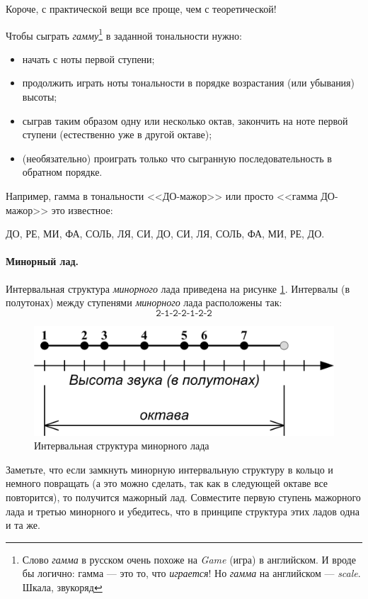 Короче, с практической вещи все проще, чем с теоретической!

Чтобы сыграть \emph{гамму}\footnote{Слово \emph{гамма} в русском очень похоже на \emph{Game} (игра) в английском. И вроде бы логично: гамма --- это то, что \emph{играется}! Но \emph{гамма} на английском --- \emph{scale}. Шкала, звукоряд} в заданной тональности нужно:
\begin{itemize}
    \item начать с ноты первой ступени;
    \item продолжить играть ноты тональности в порядке возрастания (или убывания) высоты;
    \item сыграв таким образом одну или несколько октав, закончить на ноте первой ступени (естественно уже в другой октаве); 
    \item (необязательно) проиграть только что сыгранную последовательность в обратном порядке.
\end{itemize}

Например, гамма в тональности <<ДО-мажор>> или просто <<гамма ДО-мажор>> это известное: 
\begin{center}
    ДО, РЕ, МИ, ФА, СОЛЬ, ЛЯ, СИ, ДО, СИ, ЛЯ, СОЛЬ, ФА, МИ, РЕ, ДО.
\end{center}


\paragraph{Минорный лад.} Интервальная структура \emph{минорного} лада приведена на рисунке \ref{fig:harmony:lad:mode:min}. Интервалы (в полутонах) между ступенями \emph{минорного} лада расположены так:
\[
    \texttt{2-1-2-2-1-2-2}
\]

\begin{figure}[!ht]
    \centering
    \includegraphics{fig/intervals/mode-min} 
    \caption{Интервальная структура минорного лада}\label{fig:harmony:lad:mode:min}
\end{figure} 

Заметьте, что если замкнуть минорную интервальную структуру в кольцо и немного повращать (а это можно сделать, так как в следующей октаве все повторится), то получится мажорный лад. Совместите первую ступень мажорного лада и третью минорного и убедитесь, что в принципе структура этих ладов одна и та же. 

